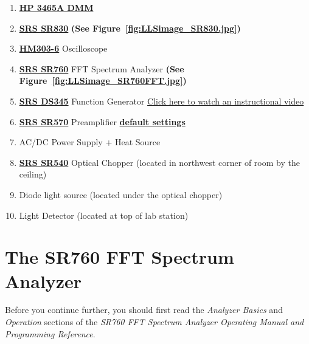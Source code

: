\documentclass{../lab}
\begin{document}
\begin{enumerate}
    \item \href{http://physics111.lib.berkeley.edu/Physics111/Reprints/LLS/11-HP3465A.pdf}{\textbf{HP 3465A DMM}}

    \item \href{http://physics111.lib.berkeley.edu/Physics111/Reprints/LLS/07-SR830.pdf}{\textbf{SRS SR830}} \textbf{(See Figure~\ref{fig:LLSimage_SR830.jpg})}
    
    \item \href{http://physics111.lib.berkeley.edu/Physics111/Reprints/LLS/HM303-6_engl.pdf}{\textbf{HM303-6}} Oscilloscope

    \item \href{http://physics111.lib.berkeley.edu/Physics111/Reprints/LLS/06-SR760.pdf}{\textbf{SRS SR760}} FFT Spectrum Analyzer \textbf{(See Figure~\ref{fig:LLSimage_SR760FFT.jpg})}

    \item \href{http://physics111.lib.berkeley.edu/Physics111/Reprints/LLS/09-DS345.pdf}{\textbf{SRS DS345}} Function Generator \href{https://youtu.be/PrM8DHFOFS0}{Click here to watch an instructional video}

    \item \href{http://physics111.lib.berkeley.edu/Physics111/Reprints/LLS/05-SR570.pdf}{\textbf{SRS SR570}} Preamplifier \href{http://experimentationlab.berkeley.edu/defaultsettings}{\textbf{default settings}}

    \item AC/DC Power Supply + Heat Source

    \item \href{http://physics111.lib.berkeley.edu/Physics111/Reprints/LLS/10-SR540.pdf}{\textbf{SRS SR540}} Optical Chopper (located in northwest corner of room by the ceiling)

    \item Diode light source (located under the optical chopper)

    \item Light Detector (located at top of lab station)

\end{enumerate}

\section{The SR760 FFT Spectrum Analyzer}

Before you continue further, you should first read the \emph{Analyzer Basics} and \emph{Operation} sections of the \emph{SR760 FFT Spectrum Analyzer Operating Manual and Programming Reference}.
\end{document}
